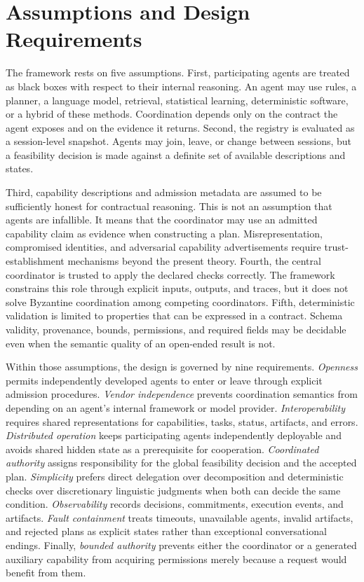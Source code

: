 \section{Assumptions and Design Requirements}

The framework rests on five assumptions. First, participating agents are treated as black boxes with respect to their internal reasoning. An agent may use rules, a planner, a language model, retrieval, statistical learning, deterministic software, or a hybrid of these methods. Coordination depends only on the contract the agent exposes and on the evidence it returns. Second, the registry is evaluated as a session-level snapshot. Agents may join, leave, or change between sessions, but a feasibility decision is made against a definite set of available descriptions and states.

Third, capability descriptions and admission metadata are assumed to be sufficiently honest for contractual reasoning. This is not an assumption that agents are infallible. It means that the coordinator may use an admitted capability claim as evidence when constructing a plan. Misrepresentation, compromised identities, and adversarial capability advertisements require trust-establishment mechanisms beyond the present theory. Fourth, the central coordinator is trusted to apply the declared checks correctly. The framework constrains this role through explicit inputs, outputs, and traces, but it does not solve Byzantine coordination among competing coordinators. Fifth, deterministic validation is limited to properties that can be expressed in a contract. Schema validity, provenance, bounds, permissions, and required fields may be decidable even when the semantic quality of an open-ended result is not.

Within those assumptions, the design is governed by nine requirements. \emph{Openness} permits independently developed agents to enter or leave through explicit admission procedures. \emph{Vendor independence} prevents coordination semantics from depending on an agent's internal framework or model provider. \emph{Interoperability} requires shared representations for capabilities, tasks, status, artifacts, and errors. \emph{Distributed operation} keeps participating agents independently deployable and avoids shared hidden state as a prerequisite for cooperation. \emph{Coordinated authority} assigns responsibility for the global feasibility decision and the accepted plan. \emph{Simplicity} prefers direct delegation over decomposition and deterministic checks over discretionary linguistic judgments when both can decide the same condition. \emph{Observability} records decisions, commitments, execution events, and artifacts. \emph{Fault containment} treats timeouts, unavailable agents, invalid artifacts, and rejected plans as explicit states rather than exceptional conversational endings. Finally, \emph{bounded authority} prevents either the coordinator or a generated auxiliary capability from acquiring permissions merely because a request would benefit from them.

